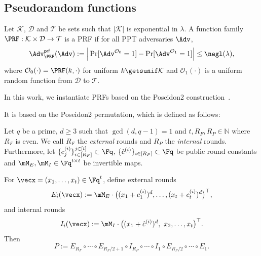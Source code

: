 \subsection{Pseudorandom functions}
\label{subsec:prelim-prf}
\label{subsec:prf}


\begin{definition}\label{def:prf}
Let $\mathcal{K}$, $\mathcal{D}$ and $\mathcal{T}$ be sets such that $|\mathcal{K}|$ is exponential in $\lambda$.
A function family $\PRF:\mathcal{K}\times\mathcal{D}\to \mathcal{T}$ is a PRF if for all PPT adversaries
$\Adv$,
\[
  \Adv^{\mathsf{prf}}_{\PRF}(\Adv)
  := \Big|\Pr[\Adv^{\mathcal{O}_0}=1]-\Pr[\Adv^{\mathcal{O}_1}=1]\Big|
  \le \negl(\lambda),
\]
where $\mathcal{O}_0(\cdot)=\PRF(k,\cdot)$ for uniform $k\getsunif \mathcal{K}$ and $\mathcal{O}_1(\cdot)$ is a uniform
random function from $\mathcal{D}$ to $\mathcal{T}$.
\end{definition}


In this work, we instantiate PRFs based on the Poseidon2 construction~\cite{AFRICACRYPT:GraKhoSch23}.

It is based on the Poseidon2 permutation, which is defined as follows:
\begin{definition}\label{def:poseidon-perm}
	Let $q$ be a prime, $d\ge 3$ such that $\gcd(d,q-1)=1$ and $t,R_F,R_P\in \mathbb{N}$ where $R_F$ is even.
	We call $R_F$ the \emph{external} rounds and $R_P$ the  \emph{internal} rounds. Furthermore, let
	 $\{c^{(i)}_j\}_{i\in [R_F]}^{j\in [t]}\subset\Fq$, $\{\hat c^{(i)}\}_{i\in [R_P]}\subset\Fq$ be public round constants and $\mM_E,\mM_I\in\Fq^{t\times t}$ be invertible maps.
	
	For $\vecx=(x_1,\dots,x_t)\in\Fq^t$, define external rounds
	\[
	E_i(\vecx) := \mM_E \cdot \big((x_1+c^{(i)}_1)^d,\dots,(x_t+c^{(i)}_t)^d\big)^\top,
	\]
	and internal rounds
	\[
	I_i(\vecx) := \mM_I \cdot \big((x_1+\hat c^{(i)})^d,\ x_2,\dots,x_t\big)^\top.
	\]
	Then
	\[
	P := E_{R_F}\circ\cdots\circ E_{R_F/2+1}\circ I_{R_P}\circ\cdots\circ I_{1}\circ E_{R_F/2}\circ\cdots\circ E_1.
	\]
\end{definition}

